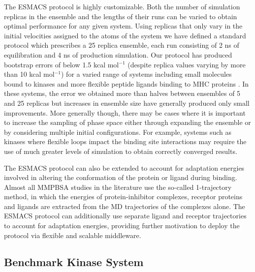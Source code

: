 \documentclass{bmcart}
\begin{document}
The ESMACS protocol is highly customizable. Both the number of simulation replicas 
in the ensemble and the lengths of their runs can be varied to
obtain optimal performance for any given system. Using replicas that only
vary in the initial velocities assigned to the atoms of the system we have
defined a standard protocol which prescribes a 25 replica ensemble, each run
consisting of 2 ns of equilibration and 4 ns of production simulation. Our
protocol has produced bootstrap errors of below 1.5 kcal mol$^{-1}$ (despite
replica values varying by more than 10 kcal mol$^{-1}$) for a varied range of
systems including small molecules bound to kinases and more flexible peptide
ligands binding to MHC proteins \cite{Wan2015, Wright2014, Wan2017brd4}.
In these systems, the error we obtained more than halves between ensembles of
5 and 25 replicas but increases in ensemble size have generally produced only
small improvements. More generally though, there may be cases where it is
important to increase the sampling of phase space either through expanding
the ensemble or by considering multiple initial configurations. 
For example, systems such as kinases where flexible loops impact the binding site interactions may require the use of much greater levels of simulation to obtain correctly converged results.

The ESMACS protocol can also be extended to account for adaptation energies
involved in altering the conformation of the protein or ligand during
binding. Almost all MMPBSA studies in the literature use the so-called
1-trajectory method, in which the energies of protein-inhibitor complexes,
receptor proteins and ligands are extracted from the MD trajectories of the
complexes alone. The ESMACS protocol can additionally use separate ligand and
receptor trajectories to account for adaptation energies, providing further
motivation to deploy the protocol via flexible and scalable middleware.

\subsection{Benchmark Kinase System}

\end{document}
